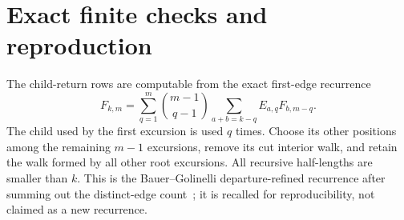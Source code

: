 \documentclass[11pt,letterpaper]{article}
\theoremstyle{remark}\newtheorem{remark}[theorem]{Remark}
\theoremstyle{definition}\newtheorem{definition}[theorem]{Definition}
\begin{document}
\section{Exact finite checks and reproduction}\label{sgm:co:sec:reproduction}
The child-return rows are computable from the exact first-edge recurrence
\begin{equation}\label{sgm:co:eq:recurrence}
 F_{k,m}=\sum_{q=1}^m\binom{m-1}{q-1}
                 \sum_{a+b=k-q}E_{a,q}F_{b,m-q}.
\end{equation}
The child used by the first excursion is used $q$ times. Choose its other positions among the remaining $m-1$ excursions, remove its cut interior walk, and retain the walk formed by all other root excursions. All recursive half-lengths are smaller than $k$. This is the Bauer--Golinelli departure-refined recurrence after summing out the distinct-edge count~\cite[Section 5.4]{bg}; it is recalled for reproducibility, not claimed as a new recurrence.
\end{document}
